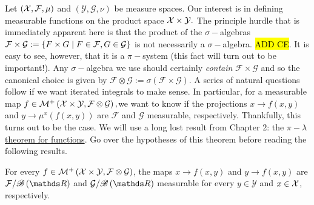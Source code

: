 Let $\left(\mathcal{X},\mathcal{F},\mu\right)$ and $\left(\mathcal{Y},\mathcal{G},\nu\right)$
be measure spaces. Our interest is in defining measurable functions
on the product space $\mathcal{X}\times\mathcal{Y}.$ The principle hurdle
that is immediately apparent here is that the product of the $\sigma-$algebras
$\mathcal{F}\times\mathcal{G}:=\left\{ F\times G\mid F\in\mathcal{F},G\in\mathcal{G}\right\} $
is not necessarily a $\sigma-$algebra. \hl{ADD CE}. It is easy to
see, however, that it is a $\pi-$system (this fact will turn out
to be important!). Any $\sigma-$algebra we use should certainly \emph{contain
}$\mathcal{F}\times\mathcal{G}$ and so the canonical choice is given
by $\mathcal{F}\otimes\mathcal{G:=\sigma\left(F\times G\right)}$.
A series of natural questions follow if we want iterated integrals
to make sense. In particular, for a measurable map $f\in\mathcal{M}^{+}\left(\mathcal{X}\times\mathcal{Y},\mathcal{F}\otimes\mathcal{G}\right),$we
want to know if the projections $x\to f(x,y)$ and $y\to\mu^{x}\left(f\left(x,y\right)\right)$
are $\mathcal{F}$ and $\mathcal{G}$ measurable, respectively. Thankfully,
this turns out to be the case. We will use a long lost result from
Chapter 2: the \hyperref[thm:piLambdaThmFunctions]{$\pi-\lambda$ theorem for functions}.
Go over the hypotheses of this theorem before reading the following
results.
\begin{lem}
\label{lem:partialFunctionMeasurability}For every $f\in\mathcal{M}^{+}\left(\mathcal{X}\times\mathcal{Y},\mathcal{F}\otimes\mathcal{G}\right)$,
the maps $x\to f(x,y)$ and $y\to f(x,y)$ are $\mathcal{F}/\borel\left(\R\right)$
and $\mathcal{G}/\borel\left(\R\right)$ measurable for every $y\in\mathcal{Y}$
and $x\in\mathcal{X}$, respectively.
\end{lem}

